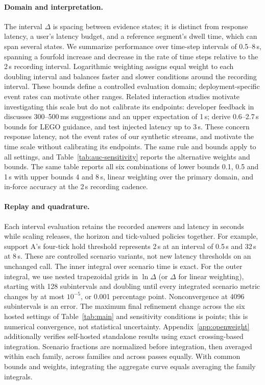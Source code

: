 \paragraph{Domain and interpretation.}
The interval $\Delta$ is spacing between evidence states; it is distinct from response latency, a user's latency budget, and a reference segment's dwell time, which can span several states.
We summarize performance over time-step intervals of 0.5--8\,s, spanning a fourfold increase and decrease in the rate of time steps relative to the 2\,s recording interval.
Logarithmic weighting assigns equal weight to each doubling interval and balances faster and slower conditions around the recording interval.
These bounds define a controlled evaluation domain; deployment-specific event rates can motivate other ranges.
Related interaction studies motivate investigating this scale but do not calibrate its endpoints: developer feedback in \citet[Section~7.2]{murali2024ai} discusses 300--500\,ms suggestions and an upper expectation of 1\,s; \citet{chen2017empirical} derive 0.6--2.7\,s bounds for LEGO guidance, and \citet{olguin2021impact} test injected latency up to 3\,s.
These concern response latency, not the event rates of our synthetic streams, and motivate the time scale without calibrating its endpoints.
The same rule and bounds apply to all settings, and Table~\ref{tab:auc-sensitivity} reports the alternative weights and bounds.
The same table reports all six combinations of lower bounds 0.1, 0.5 and 1\,s with upper bounds 4 and 8\,s, linear weighting over the primary domain, and in-force accuracy at the 2\,s recording cadence.

\paragraph{Replay and quadrature.}
Each interval evaluation retains the recorded answers and latency in seconds while scaling releases, the horizon and tick-valued policies together.
For example, support A's four-tick hold threshold represents 2\,s at an interval of 0.5\,s and 32\,s at 8\,s. These are controlled scenario variants, not new latency thresholds on an unchanged call.
The inner integral over scenario time is exact. For the outer integral, we use nested trapezoidal grids in $\ln\Delta$ (or $\Delta$ for linear weighting), starting with 128 subintervals and doubling until every integrated scenario metric changes by at most $10^{-5}$, or 0.001 percentage point.
Nonconvergence at 4096 subintervals is an error. The maximum final refinement change across the six hosted settings of Table~\ref{tab:main} and sensitivity conditions is \AucMaxRefinementChange{} points; this is numerical convergence, not statistical uncertainty. Appendix~\ref{app:openweight} additionally verifies self-hosted standalone results using exact crossing-based integration.
Scenario fractions are normalized before integration, then averaged within each family, across families and across passes equally. With common bounds and weights, integrating the aggregate curve equals averaging the family integrals.


